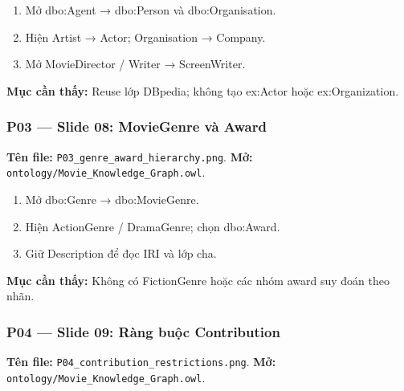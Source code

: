 \documentclass[
  11pt,
]{article}
\providecommand{\tightlist}{%
  \setlength{\itemsep}{0pt}\setlength{\parskip}{0pt}}
\begin{document}
\begin{enumerate}
\def\labelenumi{\arabic{enumi}.}
\tightlist
\item
  Mở dbo:Agent → dbo:Person và
  dbo:\allowbreak{}\allowbreak{}Orga\allowbreak{}nisation\allowbreak{}.\allowbreak{}
\item
  Hiện Artist → Actor; Organisation → Company.
\item
  Mở Movie\allowbreak{}Dir\allowbreak{}ector / Writer →
  Screen\allowbreak{}Wr\allowbreak{}iter.\allowbreak{}
\end{enumerate}

\textbf{Mục cần thấy:} Reuse lớp DBpedia; không tạo ex:Actor hoặc
ex:\allowbreak{}\allowbreak{}Organ\allowbreak{}ization.\allowbreak{}

\subsubsection{P03 --- Slide 08: MovieGenre và
Award}\label{p03-slide-08-moviegenre-vuxe0-award}

\textbf{Tên file:}
\texttt{P03\_\allowbreak{}genr\allowbreak{}e\_\allowbreak{}award\_\allowbreak{}hierarch\allowbreak{}y.\allowbreak{}png}.
\textbf{Mở:}
\texttt{ontology\allowbreak{}/\allowbreak{}\allowbreak{}Movie\_\allowbreak{}\allowbreak{}K\allowbreak{}nowledge\allowbreak{}\_\allowbreak{}\allowbreak{}Graph.\allowbreak{}o\allowbreak{}wl}.

\begin{enumerate}
\def\labelenumi{\arabic{enumi}.}
\tightlist
\item
  Mở dbo:Genre →
  dbo:\allowbreak{}\allowbreak{}Movi\allowbreak{}e\allowbreak{}Genre.\allowbreak{}
\item
  Hiện ActionGenre / DramaGenre; chọn dbo:Award.
\item
  Giữ Description để đọc IRI và lớp cha.
\end{enumerate}

\textbf{Mục cần thấy:} Không có FictionGenre hoặc các nhóm award suy
đoán theo nhãn.

\subsubsection{P04 --- Slide 09: Ràng buộc
Contribution}\label{p04-slide-09-ruxe0ng-buux1ed9c-contribution}

\textbf{Tên file:}
\texttt{P04\_\allowbreak{}cont\allowbreak{}ribution\allowbreak{}\_\allowbreak{}restric\allowbreak{}tions.\allowbreak{}pn\allowbreak{}g}.
\textbf{Mở:}
\texttt{ontology\allowbreak{}/\allowbreak{}\allowbreak{}Movie\_\allowbreak{}\allowbreak{}K\allowbreak{}nowledge\allowbreak{}\_\allowbreak{}\allowbreak{}Graph.\allowbreak{}o\allowbreak{}wl}.
\end{document}
